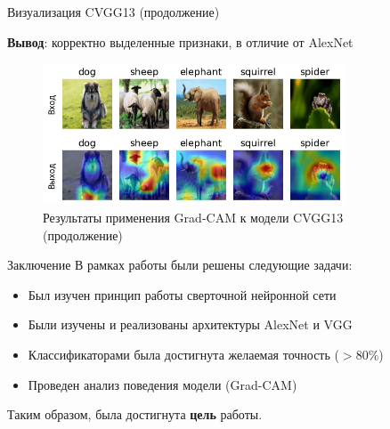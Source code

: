 \documentclass[12pt]{beamer}
\begin{document}
\begin{frame}{Визуализация CVGG13 (продолжение)}
    \begin{center}
        \textbf{Вывод}: корректно выделенные признаки, в отличие от AlexNet
    \end{center}
    \begin{figure}[h]
        \centering
        \includegraphics[width=0.8\textwidth]{images/cvgg13_out_2.png}
        \caption{\centering Результаты применения Grad-CAM к модели CVGG13 (продолжение)}
        \label{fig:cvgg13_gradcam_2}
    \end{figure}
\end{frame}

\begin{frame}{Заключение}
    В рамках работы были решены следующие задачи:
    \begin{itemize}
        \item Был изучен принцип работы сверточной нейронной сети
        \item Были изучены и реализованы архитектуры AlexNet и VGG
        \item Классификаторами была достигнута желаемая точность ($>80\%$)
        \item Проведен анализ поведения модели (Grad-CAM)
    \end{itemize}

    Таким образом, была достигнута \textbf{цель} работы.
\end{frame}
\end{document}

